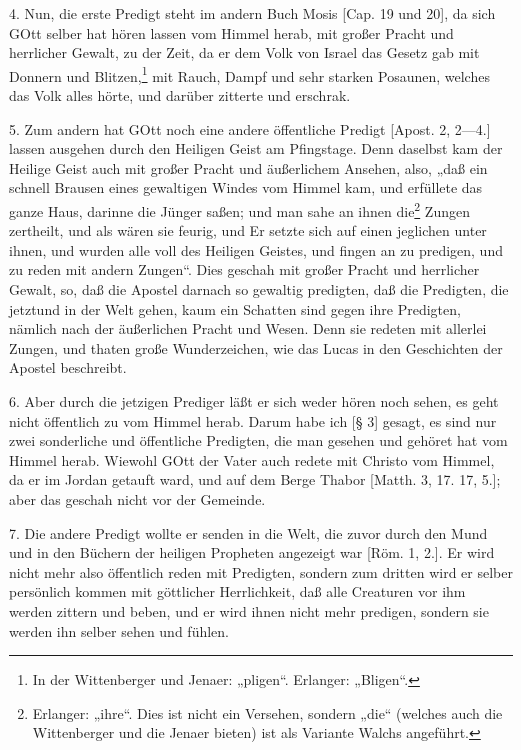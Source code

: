 4. Nun, die erste Predigt steht im andern Buch Mosis [Cap. 19 und 20], da sich GOtt selber hat hören lassen vom Himmel herab, mit großer Pracht und herrlicher Gewalt, zu der Zeit, da er dem Volk von Israel das Gesetz gab mit Donnern und Blitzen,\footnote{In der Wittenberger und Jenaer: „pligen“. Erlanger: „Bligen“.} mit Rauch, Dampf und sehr starken Posaunen, welches das Volk alles hörte, und darüber zitterte und erschrak.

5. Zum andern hat GOtt noch eine andere öffentliche Predigt [Apost. 2, 2—4.] lassen ausgehen durch den Heiligen Geist am Pfingstage. Denn daselbst kam der Heilige Geist auch mit großer Pracht und äußerlichem Ansehen, also, „daß ein schnell Brausen eines gewaltigen Windes vom Himmel kam, und erfüllete das ganze Haus, darinne die Jünger saßen; und man sahe an ihnen die\footnote{Erlanger: „ihre“. Dies ist nicht ein Versehen, sondern „die“ (welches auch die Wittenberger und die Jenaer bieten) ist als Variante Walchs angeführt.} Zungen zertheilt, und als wären sie feurig, und Er setzte sich auf einen jeglichen unter ihnen, und wurden alle voll des Heiligen Geistes, und fingen an zu predigen, und zu reden mit andern Zungen“. Dies geschah mit großer Pracht und herrlicher Gewalt, so, daß die Apostel darnach so gewaltig predigten, daß die Predigten, die jetztund in der Welt gehen, kaum ein Schatten sind gegen ihre Predigten, nämlich nach der äußerlichen Pracht und Wesen. Denn sie redeten mit allerlei Zungen, und thaten große Wunderzeichen, wie das Lucas in den Geschichten der Apostel beschreibt.

6. Aber durch die jetzigen Prediger läßt er sich weder hören noch sehen, es geht nicht öffentlich zu vom Himmel herab. Darum habe ich [§ 3] gesagt, es sind nur zwei sonderliche und öffentliche Predigten, die man gesehen und gehöret hat vom Himmel herab. Wiewohl GOtt der Vater auch redete mit Christo vom Himmel, da er im Jordan getauft ward, und auf dem Berge Thabor [Matth. 3, 17. 17, 5.]; aber das geschah nicht vor der Gemeinde.

7. Die andere Predigt wollte er senden in die Welt, die zuvor durch den Mund und in den Büchern der heiligen Propheten angezeigt war [Röm. 1, 2.]. Er wird nicht mehr also öffentlich reden mit Predigten, sondern zum dritten wird er selber persönlich kommen mit göttlicher Herrlichkeit, daß alle Creaturen vor ihm werden zittern und beben, und er wird ihnen nicht mehr predigen, sondern sie werden ihn selber sehen und fühlen.

